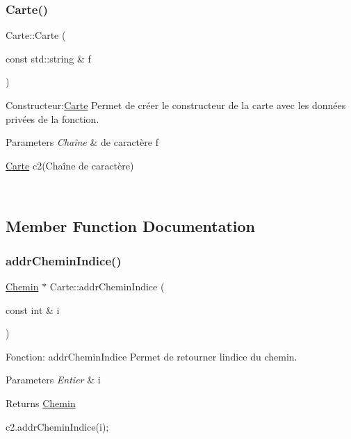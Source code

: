 \subsubsection{\texorpdfstring{Carte()}{Carte()}\hspace{0.1cm}{\footnotesize\ttfamily [3/3]}}
{\footnotesize\ttfamily Carte\+::\+Carte (\begin{DoxyParamCaption}\item[{const std\+::string \&}]{f }\end{DoxyParamCaption})}



Constructeur\+:\hyperlink{classCarte}{Carte} Permet de créer le constructeur de la carte avec les données privées de la fonction. 


\begin{DoxyParams}{Parameters}
{\em Chaîne} & de caractère f 
\begin{DoxyCode}
\hyperlink{classCarte}{Carte} c2(Chaîne de caractère)
\end{DoxyCode}
 \\
\hline
\end{DoxyParams}


\subsection{Member Function Documentation}
\mbox{\label{classCarte_a16a507cb5eb10f57f0d34052db75689c}} 
\subsubsection{\texorpdfstring{addr\+Chemin\+Indice()}{addrCheminIndice()}}
{\footnotesize\ttfamily \hyperlink{classChemin}{Chemin} $\ast$ Carte\+::addr\+Chemin\+Indice (\begin{DoxyParamCaption}\item[{const int \&}]{i }\end{DoxyParamCaption})}



Fonction\+: addr\+Chemin\+Indice Permet de retourner l\textquotesingle{}indice du chemin. 


\begin{DoxyParams}{Parameters}
{\em Entier} & i \\
\hline
\end{DoxyParams}
\begin{DoxyReturn}{Returns}
\hyperlink{classChemin}{Chemin} 
\begin{DoxyCode}
c2.addrCheminIndice(i);
\end{DoxyCode}
 
\end{DoxyReturn}
\mbox{\label{classCarte_a573a9aa2b9917152357b710fe0be6ecc}} 
